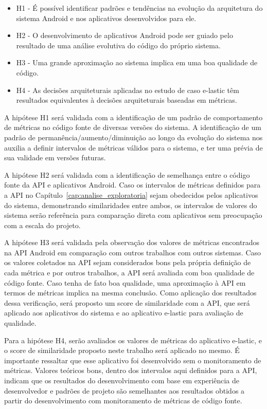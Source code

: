 \begin{itemize}
\item H1 - É possível identificar padrões e tendências na evolução da arquitetura do sistema Android e nos aplicativos desenvolvidos para ele.
\item H2 - O desenvolvimento de aplicativos Android pode ser guiado pelo resultado de uma análise evolutiva do código do próprio sistema.
\item H3 - Uma grande aproximação ao sistema implica em uma boa qualidade de código.
\item H4 - As decisões arquiteturais aplicadas no estudo de caso e-lastic têm resultados equivalentes à decisões arquiteturais baseadas em métricas.
\end{itemize}

A hipótese H1 será validada com a identificação de um padrão de comportamento de métricas no código fonte de diversas versões do sistema. A identificação de um padrão de permanência/aumento/diminuição ao longo da evolução do sistema nos auxilia a definir intervalos de métricas válidos para o sistema, e ter uma prévia de sua validade em versões futuras.

A hipótese H2 será validada com a identificação de semelhança entre o código fonte da API e aplicativos Android. Caso os intervalos de métricas definidos para a API no Capítulo~\ref{cap:analise_exploratoria} sejam obedecidos pelos aplicativos do sistema, demonstrando similaridades entre ambos, os intervalos de valores do sistema serão referência para comparação direta com aplicativos sem preocupação com a escala do projeto.

A hipótese H3 será validada pela observação dos valores de métricas encontrados na API Android em comparação com outros trabalhos com outros sistemas. Caso os valores coletados na API sejam considerados bons pela própria definição de cada métrica e por outros trabalhos, a API será avaliada com boa qualidade de código fonte. Caso tenha de fato boa qualidade, uma aproximação à API em termos de métricas implica na mesma conclusão. Como aplicação dos resultados dessa verificação, será proposto um score de similaridade com a API, que será aplicado aos aplicativos do sistema e ao aplicativo e-lastic para avaliação de qualidade.

Para a hipótese H4, serão avaliados os valores de métricas do aplicativo e-lastic, e o score de similaridade proposto neste trabalho será aplicado no mesmo. É importante ressaltar que esse aplicativo foi desenvolvido sem o monitoramento de métricas. Valores teóricos bons, dentro dos intervalos aqui definidos para a API, indicam que os resultados do desenvolvimento com base em experiência de desenvolvedor e padrões de projeto são semelhantes aos resultados obtidos a partir do desenvolvimento com monitoramento de métricas de código fonte.

